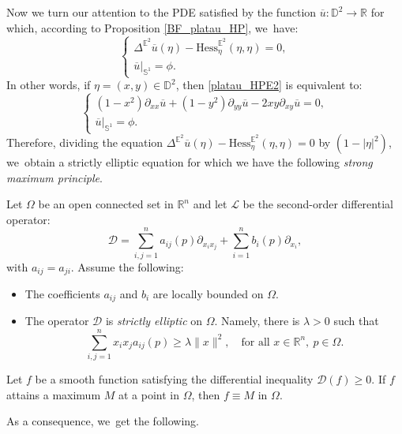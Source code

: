 Now we turn our attention to the PDE satisfied by the function $\overline{u}:\mathbb{D}^2 \to \mathbb{R}$ for which, according to Proposition \ref{BF_platau_HP}, we~have:
\begin{equation}
\begin{cases}\label{platau_HPE2}
\Delta^{\mathbb{E}^2}\overline{u}(\eta) - \mathrm{Hess}_{\eta}^{\mathbb{E}^2}(\eta,\eta) = 0, \\
\overline{u}|_{\mathbb{S}^1} = \phi.
\end{cases}
\end{equation}
In other words, if $\eta = (x,y) \in \mathbb{D}^2$, then \eqref{platau_HPE2} is equivalent to:
\begin{equation}
\begin{cases}
(1-x^2)\partial_{xx}\overline{u} + (1-y^2)\partial_{yy}\overline{u} - 2xy\partial_{xy}\overline{u} = 0, \\
\overline{u}|_{\mathbb{S}^1} = \phi.
\end{cases}
\end{equation}
Therefore, dividing the equation $\Delta^{\mathbb{E}^2}\overline{u}(\eta) - \mathrm{Hess}_{\eta}^{\mathbb{E}^2}(\eta,\eta) = 0$ by $(1-\lvert\eta\rvert^2)$, we~obtain a strictly elliptic equation for which we have the following \emph{strong maximum principle}.

\begin{theorem}\label{Strong_Max_P}
Let $\Omega$ be an open connected set in $\mathbb{R}^n$ and let $\mathcal{L}$ be the second-order differential operator:
\[
\mathcal{D} = \sum_{i,j=1}^{n}a_{ij}(p)\partial_{x_ix_j} + \sum_{i=1}^nb_i(p)\partial_{x_i},
\]
with $a_{ij} = a_{ji}$. Assume the following:
\begin{itemize}
\item The coefficients $a_{ij}$ and $b_i$ are locally bounded on $\Omega$.
\item The operator $\mathcal{D}$ is \emph{strictly elliptic} on $\Omega$. Namely, there is $\lambda > 0$ such that
\[
\sum_{i,j=1}^{n} x_i x_j a_{ij}(p) \geq \lambda \lVert x \rVert^2, \quad \text{for all } x \in \mathbb{R}^n, \ p \in \Omega.
\]
\end{itemize}
Let $f$ be a smooth function satisfying the differential inequality $\mathcal{D}(f) \geq 0$. If $f$ attains a maximum $M$ at a point in $\Omega$, then $f \equiv M$ in $\Omega$.
\end{theorem}

As a consequence, we~get the following.

